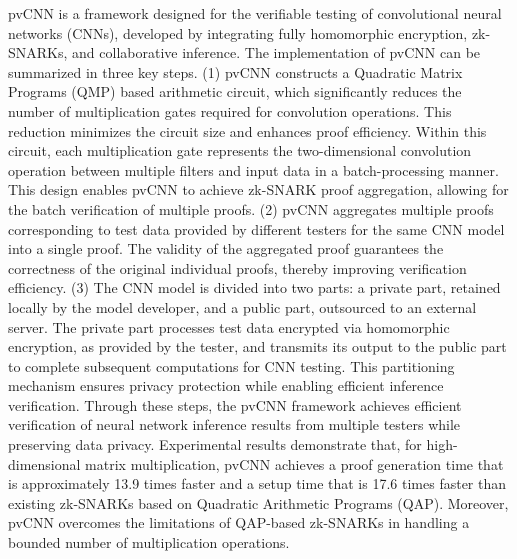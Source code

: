 \documentclass[journal]{IEEEtran}
\begin{document}
pvCNN \cite{weng2023pvcnn} is a framework designed for the verifiable testing of convolutional neural networks (CNNs), developed by integrating fully homomorphic encryption, zk-SNARKs, and collaborative inference. The implementation of pvCNN can be summarized in three key steps. (1) pvCNN constructs a Quadratic Matrix Programs (QMP) based arithmetic circuit, which significantly reduces the number of multiplication gates required for convolution operations. This reduction minimizes the circuit size and enhances proof efficiency. Within this circuit, each multiplication gate represents the two-dimensional convolution operation between multiple filters and input data in a batch-processing manner. This design enables pvCNN to achieve zk-SNARK proof aggregation, allowing for the batch verification of multiple proofs. (2) pvCNN aggregates multiple proofs corresponding to test data provided by different testers for the same CNN model into a single proof. The validity of the aggregated proof guarantees the correctness of the original individual proofs, thereby improving verification efficiency. (3) The CNN model is divided into two parts: a private part, retained locally by the model developer, and a public part, outsourced to an external server. The private part processes test data encrypted via homomorphic encryption, as provided by the tester, and transmits its output to the public part to complete subsequent computations for CNN testing. This partitioning mechanism ensures privacy protection while enabling efficient inference verification. Through these steps, the pvCNN framework achieves efficient verification of neural network inference results from multiple testers while preserving data privacy. Experimental results demonstrate that, for high-dimensional matrix multiplication, pvCNN achieves a proof generation time that is approximately 13.9 times faster and a setup time that is 17.6 times faster than existing zk-SNARKs based on Quadratic Arithmetic Programs (QAP). Moreover, pvCNN overcomes the limitations of QAP-based zk-SNARKs in handling a bounded number of multiplication operations.
\end{document}
